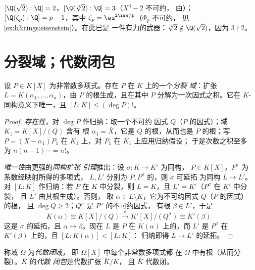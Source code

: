 \begin{example}\label{ex:b3:galois:degrees}
$[\Q(\sqrt2):\Q] = 2$，$[\Q(\sqrt[3]2):\Q] = 3$（$X^3 - 2$ 不可约，
由）；$[\Q(\zeta_p):\Q] = p - 1$，其中
$\zeta_p = \eu^{2\iu\pi/p}$（$\Phi_p$ 不可约，
见\cref{ex:b3:rings:eisenstein}）。在此已是
一件有力的武器：$\sqrt[3]2 \notin \Q(\sqrt2)$，因为 $3 \nmid 2$。
\end{example}

\section{分裂域；代数闭包}

\begin{theorem}[分裂域]\label{thm:b3:galois:splitting}
设 $P \in K[X]$ 为非常数多项式。存在 $P$ 在 $K$ 上的一个\emph{分裂
域}：扩张 $L =
K(\alpha_1, \dots, \alpha_n)$，由 $P$ 的根生成，且在其中
$P$ 分解为一次因式之积。它在
$K$-同构意义下唯一，且 $[L:K] \leq (\deg P)!$。
\end{theorem}

\begin{proof}
\emph{存在性}，对 $\deg P$ 作归纳：取一个不可约
因式 $Q$（$P$ 的因式）；域 $K_1 = K[X]/(Q)$ 含有
根 $\alpha_1 = \bar X$，它是 $Q$ 的根，从而也是 $P$ 的根；写 $P = (X -
\alpha_1)P_1$ 在 $K_1$ 上，对 $P_1$ 在 $K_1$ 上应用归纳假设；
于是次数之积至多为 $n(n-1)\cdots = n!$。

\emph{唯一性}由更强的\emph{同构扩张
引理}推出：设 $\sigma \colon K \to K'$ 为同构，
$P \in K[X]$，$P^\sigma$ 为系数经映射所得的多项式，
$L, L'$ 分别为 $P, P^\sigma$ 的，则 $\sigma$ 可延拓
为同构 $L \to L'$。对 $[L:K]$ 作归纳：若 $P$ 在
$K$ 中分裂，则 $L = K$，且 $L' = K'$（$P^\sigma$ 在 $K'$ 中分裂，
且 $L'$ 由其根生成）。否则，
取 $\alpha \in L \setminus K$，它为不可约因式 $Q$（$P$ 的因式）的根，
且 $\deg Q \geq 2$；$Q^\sigma$ 是 $P^\sigma$ 的不可约因式，
有根 $\beta \in L'$，于是
\[
K(\alpha) \cong K[X]/(Q) \xrightarrow{\ \sigma\ }
K'[X]/(Q^\sigma) \cong K'(\beta)
\]
这是 $\sigma$ 的延拓，且 $\alpha \mapsto \beta$。现在 $L$ 是
$P$ 在 $K(\alpha)$ 上的，而 $L'$ 是 $P^\sigma$ 在
$K'(\beta)$ 上的，且 $[L : K(\alpha)] < [L:K]$：
归纳即得 $L \to L'$ 的延拓。
\end{proof}

\begin{definition}\label{def:b3:galois:closure}
称域 $\Omega$ 为\emph{代数闭}域，
即 $\Omega[X]$ 中每个非常数多项式都
在 $\Omega$ 中有根（从而分裂）。$K$ 的\emph{代数
闭包}是代数扩张 $\bar K/K$，
且 $\bar K$ 代数闭。
\end{definition}

